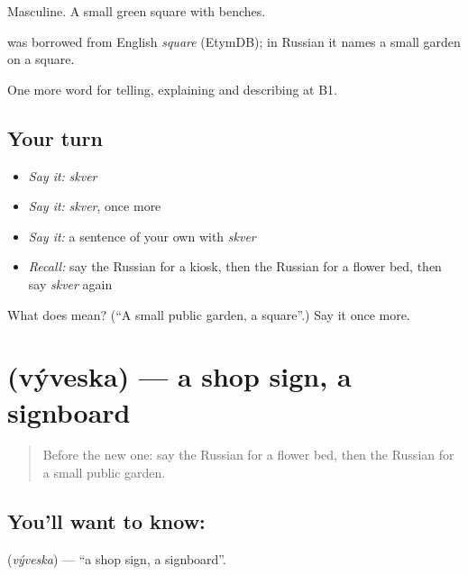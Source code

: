 Masculine. A small green square with benches.

\begin{cousinweb}
\emph{} was borrowed from English \emph{square} (EtymDB); in Russian it names a small garden on a square.
\end{cousinweb}

\begin{grammarlens}[title={What you've built}]
One more word for telling, explaining and describing at B1.
\end{grammarlens}

\subsection*{Your turn}
\begin{itemize}
\raggedright
  \item \emph{Say it:} \emph{skver}
  \item \emph{Say it:} \emph{skver}, once more
  \item \emph{Say it:} a sentence of your own with \emph{skver}
  \item \emph{Recall:} say the Russian for a kiosk, then the Russian for a flower bed, then say \emph{skver} again
\end{itemize}

\begin{tcolorbox}[breakable,colback=teal!4,colframe=teal!35!black,title={Before you move on}]
What does  mean? (\textquotedblleft{}A small public garden, a square\textquotedblright{}.) Say it once more.
\end{tcolorbox}
\section[\texorpdfstring{\ru{вывеска} (výveska)}{вывеска (výveska)}]{ (výveska) — a shop sign, a signboard}

\label{lesson:RU-C446-vyveska}



\begin{quote}
Before the new one: say the Russian for a flower bed, then the Russian for a small public garden.
\end{quote}

\subsection*{You'll want to know: }
\textbf{} (\emph{výveska}) — \textquotedblleft{}a shop sign, a signboard\textquotedblright{}.

